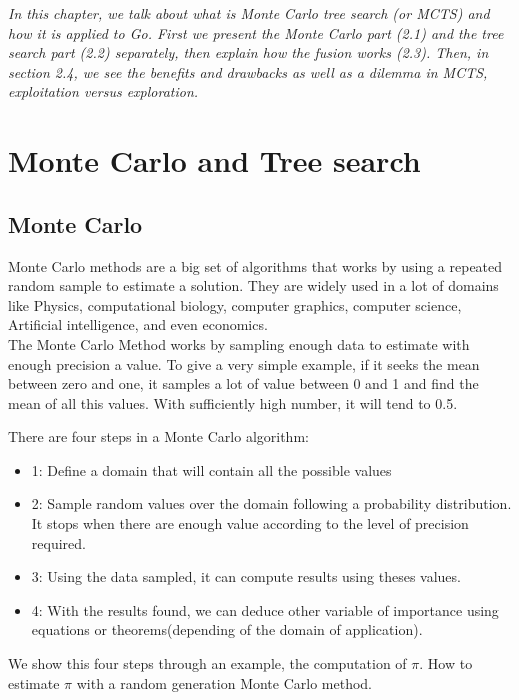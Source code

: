 
\textit{In this chapter, we talk about what is Monte Carlo tree search (or MCTS) and how it is applied to Go.
First we present the Monte Carlo part (2.1) and the tree search part (2.2) separately, then explain how the fusion works (2.3).
Then, in section 2.4, we see the benefits and drawbacks as well as a dilemma in MCTS, exploitation versus exploration. }

\section{Monte Carlo and Tree search}

\subsection{Monte Carlo}

Monte Carlo methods are a big set of algorithms that works by using a repeated random sample to estimate a solution. They are widely used in a lot of domains like Physics, computational biology, computer graphics, computer science, Artificial intelligence, and even economics. 
\\

The Monte Carlo Method works by sampling enough data to estimate with enough precision a value. To give a very simple example, if it seeks the mean between zero and one, it samples a lot of value between 0 and 1 and find the mean of all this values. With sufficiently high number, it will tend to 0.5.

There are four steps in a Monte Carlo algorithm: 

\begin{itemize}
\item 1: Define a domain that will contain all the possible values 
\item 2: Sample random values over the domain following a probability distribution. It stops when there are enough value according to the level of precision required. 
\item 3: Using the data sampled, it can compute results using theses values. 
\item 4: With the results found, we can deduce other variable of importance using equations or theorems(depending of the domain of application). 
\end{itemize} 

We show this four steps through an example, the computation of $\pi$. How to estimate $\pi$ with a random generation Monte Carlo method. 

